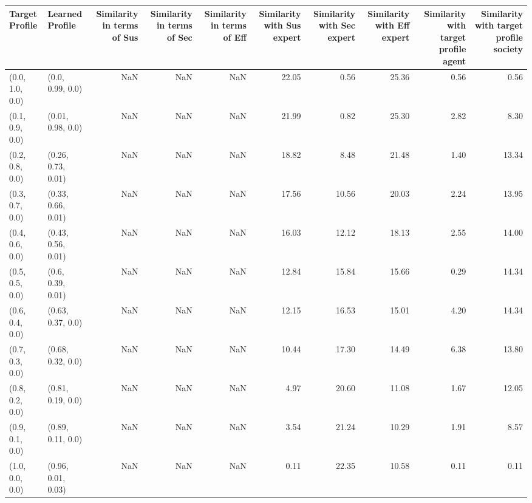 \begin{tabular}{llrrrrrrrr}
\toprule
Target Profile & Learned Profile & Similarity in terms of Sus & Similarity in terms of Sec & Similarity in terms of Eff & Similarity with Sus expert & Similarity with Sec expert & Similarity with Eff expert & Similarity with target profile agent & Similarity with target profile society \\
\midrule
(0.0, 1.0, 0.0) & (0.0, 0.99, 0.0) & NaN & NaN & NaN & 22.05 & 0.56 & 25.36 & 0.56 & 0.56 \\
(0.1, 0.9, 0.0) & (0.01, 0.98, 0.0) & NaN & NaN & NaN & 21.99 & 0.82 & 25.30 & 2.82 & 8.30 \\
(0.2, 0.8, 0.0) & (0.26, 0.73, 0.01) & NaN & NaN & NaN & 18.82 & 8.48 & 21.48 & 1.40 & 13.34 \\
(0.3, 0.7, 0.0) & (0.33, 0.66, 0.01) & NaN & NaN & NaN & 17.56 & 10.56 & 20.03 & 2.24 & 13.95 \\
(0.4, 0.6, 0.0) & (0.43, 0.56, 0.01) & NaN & NaN & NaN & 16.03 & 12.12 & 18.13 & 2.55 & 14.00 \\
(0.5, 0.5, 0.0) & (0.6, 0.39, 0.01) & NaN & NaN & NaN & 12.84 & 15.84 & 15.66 & 0.29 & 14.34 \\
(0.6, 0.4, 0.0) & (0.63, 0.37, 0.0) & NaN & NaN & NaN & 12.15 & 16.53 & 15.01 & 4.20 & 14.34 \\
(0.7, 0.3, 0.0) & (0.68, 0.32, 0.0) & NaN & NaN & NaN & 10.44 & 17.30 & 14.49 & 6.38 & 13.80 \\
(0.8, 0.2, 0.0) & (0.81, 0.19, 0.0) & NaN & NaN & NaN & 4.97 & 20.60 & 11.08 & 1.67 & 12.05 \\
(0.9, 0.1, 0.0) & (0.89, 0.11, 0.0) & NaN & NaN & NaN & 3.54 & 21.24 & 10.29 & 1.91 & 8.57 \\
(1.0, 0.0, 0.0) & (0.96, 0.01, 0.03) & NaN & NaN & NaN & 0.11 & 22.35 & 10.58 & 0.11 & 0.11 \\
\bottomrule
\end{tabular}

